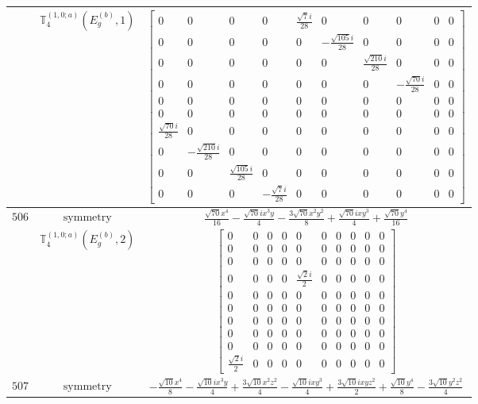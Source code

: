 \documentclass[fleqn,8pt,landscape]{jsarticle}
\begin{document}
\begin{longtable}{ccc}
$  $ & $ \mathbb{T}_{4}^{(1,0;a)}(E_{g}^{(b)},1) $ & $ \begin{bmatrix} 0 & 0 & 0 & 0 & \frac{\sqrt{7} i}{28} & 0 & 0 & 0 & 0 & 0 \\ 0 & 0 & 0 & 0 & 0 & - \frac{\sqrt{105} i}{28} & 0 & 0 & 0 & 0 \\ 0 & 0 & 0 & 0 & 0 & 0 & \frac{\sqrt{210} i}{28} & 0 & 0 & 0 \\ 0 & 0 & 0 & 0 & 0 & 0 & 0 & - \frac{\sqrt{70} i}{28} & 0 & 0 \\ 0 & 0 & 0 & 0 & 0 & 0 & 0 & 0 & 0 & 0 \\ 0 & 0 & 0 & 0 & 0 & 0 & 0 & 0 & 0 & 0 \\ \frac{\sqrt{70} i}{28} & 0 & 0 & 0 & 0 & 0 & 0 & 0 & 0 & 0 \\ 0 & - \frac{\sqrt{210} i}{28} & 0 & 0 & 0 & 0 & 0 & 0 & 0 & 0 \\ 0 & 0 & \frac{\sqrt{105} i}{28} & 0 & 0 & 0 & 0 & 0 & 0 & 0 \\ 0 & 0 & 0 & - \frac{\sqrt{7} i}{28} & 0 & 0 & 0 & 0 & 0 & 0 \end{bmatrix} $ \\ \hline
$ 506 $ & $ \text{symmetry} $ & $ \frac{\sqrt{70} x^{4}}{16} - \frac{\sqrt{70} i x^{3} y}{4} - \frac{3 \sqrt{70} x^{2} y^{2}}{8} + \frac{\sqrt{70} i x y^{3}}{4} + \frac{\sqrt{70} y^{4}}{16} $ \\
$  $ & $ \mathbb{T}_{4}^{(1,0;a)}(E_{g}^{(b)},2) $ & $ \begin{bmatrix} 0 & 0 & 0 & 0 & 0 & 0 & 0 & 0 & 0 & 0 \\ 0 & 0 & 0 & 0 & 0 & 0 & 0 & 0 & 0 & 0 \\ 0 & 0 & 0 & 0 & 0 & 0 & 0 & 0 & 0 & 0 \\ 0 & 0 & 0 & 0 & \frac{\sqrt{2} i}{2} & 0 & 0 & 0 & 0 & 0 \\ 0 & 0 & 0 & 0 & 0 & 0 & 0 & 0 & 0 & 0 \\ 0 & 0 & 0 & 0 & 0 & 0 & 0 & 0 & 0 & 0 \\ 0 & 0 & 0 & 0 & 0 & 0 & 0 & 0 & 0 & 0 \\ 0 & 0 & 0 & 0 & 0 & 0 & 0 & 0 & 0 & 0 \\ 0 & 0 & 0 & 0 & 0 & 0 & 0 & 0 & 0 & 0 \\ \frac{\sqrt{2} i}{2} & 0 & 0 & 0 & 0 & 0 & 0 & 0 & 0 & 0 \end{bmatrix} $ \\ \hline
$ 507 $ & $ \text{symmetry} $ & $ - \frac{\sqrt{10} x^{4}}{8} - \frac{\sqrt{10} i x^{3} y}{4} + \frac{3 \sqrt{10} x^{2} z^{2}}{4} - \frac{\sqrt{10} i x y^{3}}{4} + \frac{3 \sqrt{10} i x y z^{2}}{2} + \frac{\sqrt{10} y^{4}}{8} - \frac{3 \sqrt{10} y^{2} z^{2}}{4} $ \\

\end{longtable}
\end{document}
